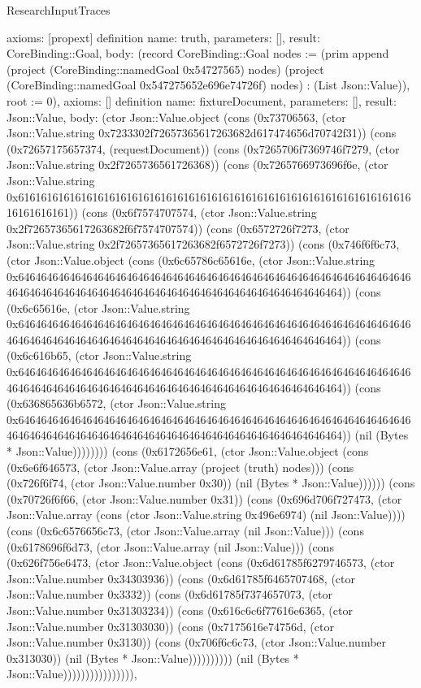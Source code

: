 \begin{lexlean}{ResearchInputTraces}
\begin{semanticmodule}
{ axioms: [propext]
}
definition{
 name: truth,
 parameters: [],
 result: CoreBinding::Goal,
 body: (record CoreBinding::Goal {nodes := (prim append (project (CoreBinding::namedGoal 0x54727565) nodes) (project (CoreBinding::namedGoal 0x547275652e696e74726f) nodes) : (List Json::Value)), root := 0}),
 axioms: []
}
definition{
 name: fixtureDocument,
 parameters: [],
 result: Json::Value,
 body: (ctor Json::Value.object (cons (0x73706563, (ctor Json::Value.string 0x7233302f72657365617263682d617474656d70742f31)) (cons (0x72657175657374, (requestDocument)) (cons (0x7265706f7369746f7279, (ctor Json::Value.string 0x2f7265736561726368)) (cons (0x7265766973696f6e, (ctor Json::Value.string 0x61616161616161616161616161616161616161616161616161616161616161616161616161616161)) (cons (0x6f7574707574, (ctor Json::Value.string 0x2f72657365617263682f6f7574707574)) (cons (0x6572726f7273, (ctor Json::Value.string 0x2f72657365617263682f6572726f7273)) (cons (0x746f6f6c73, (ctor Json::Value.object (cons (0x6c65786c65616e, (ctor Json::Value.string 0x64646464646464646464646464646464646464646464646464646464646464646464646464646464646464646464646464646464646464646464646464646464)) (cons (0x6c65616e, (ctor Json::Value.string 0x64646464646464646464646464646464646464646464646464646464646464646464646464646464646464646464646464646464646464646464646464646464)) (cons (0x6c616b65, (ctor Json::Value.string 0x64646464646464646464646464646464646464646464646464646464646464646464646464646464646464646464646464646464646464646464646464646464)) (cons (0x636865636b6572, (ctor Json::Value.string 0x64646464646464646464646464646464646464646464646464646464646464646464646464646464646464646464646464646464646464646464646464646464)) (nil (Bytes * Json::Value)))))))) (cons (0x6172656e61, (ctor Json::Value.object (cons (0x6e6f646573, (ctor Json::Value.array (project (truth) nodes))) (cons (0x726f6f74, (ctor Json::Value.number 0x30)) (nil (Bytes * Json::Value)))))) (cons (0x70726f6f66, (ctor Json::Value.number 0x31)) (cons (0x696d706f727473, (ctor Json::Value.array (cons (ctor Json::Value.string 0x496e6974) (nil Json::Value)))) (cons (0x6c6576656c73, (ctor Json::Value.array (nil Json::Value))) (cons (0x6178696f6d73, (ctor Json::Value.array (nil Json::Value))) (cons (0x626f756e6473, (ctor Json::Value.object (cons (0x6d61785f6279746573, (ctor Json::Value.number 0x34303936)) (cons (0x6d61785f6465707468, (ctor Json::Value.number 0x3332)) (cons (0x6d61785f7374657073, (ctor Json::Value.number 0x31303234)) (cons (0x616c6c6f77616e6365, (ctor Json::Value.number 0x31303030)) (cons (0x7175616e74756d, (ctor Json::Value.number 0x3130)) (cons (0x706f6c6c73, (ctor Json::Value.number 0x313030)) (nil (Bytes * Json::Value)))))))))) (nil (Bytes * Json::Value)))))))))))))))),
}
\end{semanticmodule}
\end{lexlean}
